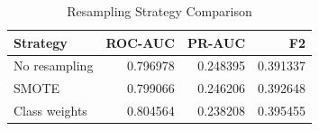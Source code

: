 \begin{table}
\caption{Resampling Strategy Comparison}
\label{tab:smote}
\begin{tabular}{lrrr}
\toprule
Strategy & ROC-AUC & PR-AUC & F2 \\
\midrule
No resampling & 0.796978 & 0.248395 & 0.391337 \\
SMOTE & 0.799066 & 0.246206 & 0.392648 \\
Class weights & 0.804564 & 0.238208 & 0.395455 \\
\bottomrule
\end{tabular}
\end{table}
